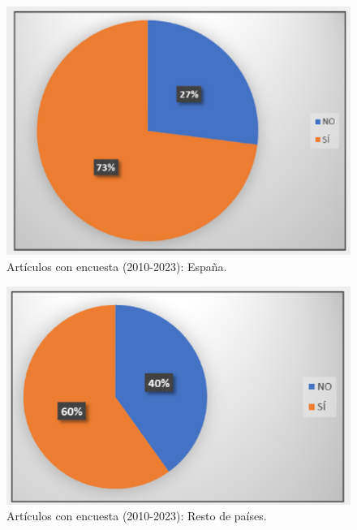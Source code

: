 \documentclass[spanish]{textolivre}
\begin{document}
\noindent
\begin{minipage}[b]{0.42\textwidth}
    \begin{figure}[H]
        \centering
        \includegraphics[width=\linewidth]{images/IMAGE7.png}
        \caption{Artículos con encuesta (2010-2023): España.}
        \label{fig-7}
    \end{figure}
\end{minipage}
\hfill
\begin{minipage}[b]{0.48\textwidth}
    \begin{figure}[H]
        \centering
        \includegraphics[width=\linewidth]{images/IMAGE8.png}
        \caption{Artículos con encuesta (2010-2023): Resto de países.}
        \label{fig-8}
    \end{figure}
\end{minipage}
\bigskip
\end{document}
